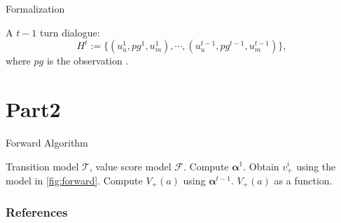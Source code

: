 \documentclass{beamer}
\begin{document}
\begin{frame}{Formalization}

\begin{definition}[Def1]
A $t-1$ turn dialogue:
\begin{equation}
    H^t := \{(u_u^{1}, pg^{1}, u_m^{1}), \cdots, (u_u^{t-1}, pg^{t-1}, u_m^{t-1})\},
\end{equation}
where $pg$ is the observation .
\end{definition}

\end{frame}

\section{Part2}


\begin{frame}[fragile]{Forward Algorithm}
\begin{algorithm}[H]%
\small
\caption{Forward algorithm.}
\label{alg:algorithm}
\begin{algorithmic}%

\REQUIRE Transition model $\mathcal{T}$, value score model $\mathcal{F}$.
\STATE Compute $\bm{\alpha}^1$.
    \STATE Obtain $v_+^i$ using the model in \ref{fig:forward}.
        \STATE Compute $V_+(a)$ using $\bm{\alpha}^{t-1}$.
    \ENDIF
\ENDFOR
\RETURN $V_+(a)$ as a function.

\end{algorithmic}
\end{algorithm}
\end{frame}


\begin{frame} [allowframebreaks]\frametitle{References}
               
        
        
\end{frame}
\end{document}
